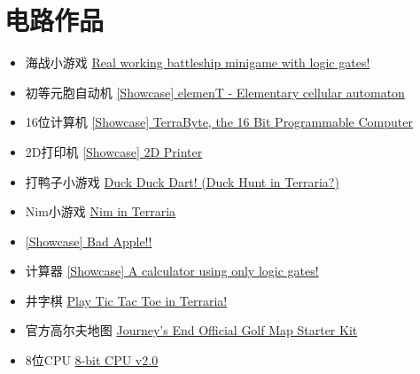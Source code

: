 \section{电路作品}
\begin{itemize}
\item 海战小游戏 \href{https://forums.terraria.org/index.php?threads/real-working-battleship-minigame-with-logic-gates.85957/}{Real working battleship minigame with logic gates!}
\item 初等元胞自动机 \href{https://forums.terraria.org/index.php?threads/showcase-element-elementary-cellular-automaton.75798/}{[Showcase] elemenT - Elementary cellular automaton}
\item 16位计算机 \href{https://forums.terraria.org/index.php?threads/showcase-terrabyte-the-16-bit-programmable-computer.85479/}{[Showcase] TerraByte, the 16 Bit Programmable Computer}
\item 2D打印机 \href{https://forums.terraria.org/index.php?threads/showcase-2d-printer.75766/}{[Showcase] 2D Printer}
\item 打鸭子小游戏 \href{https://forums.terraria.org/index.php?threads/duck-duck-dart-duck-hunt-in-terraria.45200/}{Duck Duck Dart! (Duck Hunt in Terraria?)}
\item Nim小游戏 \href{https://forums.terraria.org/index.php?threads/nim-in-terraria.76089/}{Nim in Terraria}
\item \href{https://forums.terraria.org/index.php?threads/showcase-bad-apple.76348/}{[Showcase] Bad Apple!!}
\item 计算器 \href{https://forums.terraria.org/index.php?threads/showcase-a-calculator-using-only-logic-gates.76453/}{[Showcase] A calculator using only logic gates!}
\item 井字棋 \href{https://forums.terraria.org/index.php?threads/play-tic-tac-toe-in-terraria.76804/}{Play Tic Tac Toe in Terraria!}
\item 官方高尔夫地图 \href{https://forums.terraria.org/index.php?threads/terraria-journeys-end-official-golf-map-starter-kit.87208/}{Journey's End Official Golf Map Starter Kit}
\item 8位CPU \href{https://forums.terraria.org/index.php?threads/8-bit-cpu-v2-0.95542/}{8-bit CPU v2.0}
\end{itemize}

